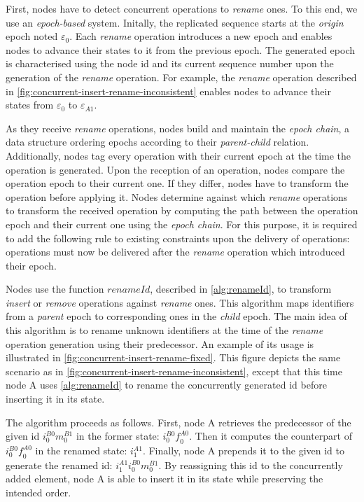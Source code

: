 \documentclass[10pt,journal,compsoc]{IEEEtran}
\newcommand{\trm}[1]{\mathit{#1}}
\newcommand{\id}[3]{$\trm{#1}^{\trm{#2}}_{\trm{#3}}$}
\newcommand{\epoch}[1]{$\varepsilon_{#1}$}
\begin{document}
First, nodes have to detect concurrent operations to \emph{rename} ones.
To this end, we use an \emph{epoch-based} system.
Initally, the replicated sequence starts at the \emph{origin} epoch noted \epoch{0}.
Each \emph{rename} operation introduces a new epoch and enables nodes to advance their states to it from the previous epoch.
The generated epoch is characterised using the node id and its current sequence number upon the generation of the \emph{rename} operation.
For example, the \emph{rename} operation described in \autoref{fig:concurrent-insert-rename-inconsistent} enables nodes to advance their states from \epoch{0} to \epoch{A1}.

As they receive \emph{rename} operations, nodes build and maintain the \emph{epoch chain}, a data structure ordering epochs according to their \emph{parent-child} relation.
Additionally, nodes tag every operation with their current epoch at the time the operation is generated.
Upon the reception of an operation, nodes compare the operation epoch to their current one.
If they differ, nodes have to transform the operation before applying it.
Nodes determine against which \emph{rename} operations to transform the received operation by computing the path between the operation epoch and their current one using the \emph{epoch chain}.
For this purpose, it is required to add the following rule to existing constraints upon the delivery of operations: operations must now be delivered after the \emph{rename} operation which introduced their epoch.

Nodes use the function $\trm{renameId}$, described in \autoref{alg:renameId}, to transform \emph{insert} or \emph{remove} operations against \emph{rename} ones.
This algorithm maps identifiers from a \emph{parent} epoch to corresponding ones in the \emph{child} epoch.
The main idea of this algorithm is to rename unknown identifiers at the time of the \emph{rename} operation generation using their predecessor.
An example of its usage is illustrated in \autoref{fig:concurrent-insert-rename-fixed}.
This figure depicts the same scenario as in \autoref{fig:concurrent-insert-rename-inconsistent}, except that this time node A uses \autoref{alg:renameId} to rename the concurrently generated id before inserting it in its state.

The algorithm proceeds as follows.
First, node A retrieves the predecessor of the given id \id{i}{B0}{0}\id{m}{B1}{0} in the former state: \id{i}{B0}{0}\id{f}{A0}{0}.
Then it computes the counterpart of \id{i}{B0}{0}\id{f}{A0}{0} in the renamed state: \id{i}{A1}{1}.
Finally, node A prepends it to the given id to generate the renamed id: \id{i}{A1}{1}\id{i}{B0}{0}\id{m}{B1}{0}.
By reassigning this id to the concurrently added element, node A is able to insert it in its state while preserving the intended order.
\end{document}
